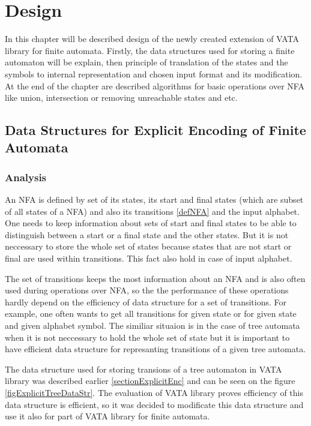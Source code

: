 \chapter{Design}
\label{design}
In this chapter will be described design of the newly created extension of VATA library for finite automata. 
Firstly, the data structures used for storing a finite automaton will be explain, then principle of translation of the states and the symbols to internal
representation and chosen input format and its modification. At the end of the chapter are described algorithms for basic operations over NFA like union, 
intersection or removing unreachable states and etc.

\section{Data Structures for Explicit Encoding of Finite Automata}
\label{data structure explicit}
\subsection{Analysis}
\label{analysis}
An NFA is defined by set of its states, its start and final states (which are subset of all states of a NFA) and also its
transitions \ref{defNFA} and the input alphabet. One needs to keep information about sets of start and final states to be able to distinguish
between a start or a final state and the other states. But it is not neccessary to store the whole set of states because states that are not start or final
are used within transitions. This fact also hold in case of input alphabet. 

The set of transitions keeps the most information about an NFA and is also often used
during operations over NFA, so the the performance of these operations hardly depend on the efficiency of data structure for a set of transitions. For example,
one often wants to get all transitions for given state or for given state and given alphabet symbol. The similiar situaion is in the case
of tree automata when it is not neccessary to hold the whole set of state but it is important to have efficient data structure for represanting 
transitions of a given tree automata.

The data structure used for storing transions of a tree automaton in VATA library was described earlier \ref{sectionExplicitEnc} and can be seen
on the figure \ref{figExplicitTreeDataStr}. The evaluation of VATA library \cite{libvata} proves efficiency of this data structure is efficient, so it was
decided to modificate this data structure and use it also for part of VATA library for finite automata.

